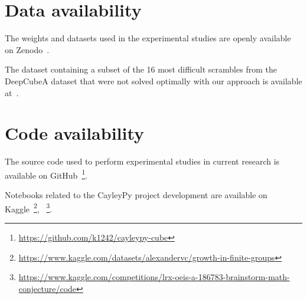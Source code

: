 
\section{Data availability}
The weights and datasets used in the experimental studies are openly available on Zenodo~\cite{chervov_dataset}.

The dataset containing a subset of the 16 most difficult scrambles from the DeepCubeA dataset that were not solved optimally with our approach is available at~\cite{chervov_hard}.

\phantom{42}

\section{Code availability}

The source code used to perform experimental studies in current research is available on GitHub~\footnote{\url{https://github.com/k1242/cayleypy-cube}}.

Notebooks related to the CayleyPy project development are available on Kaggle~\footnote{\url{https://www.kaggle.com/datasets/alexandervc/growth-in-finite-groups}}, ~\footnote{\url{https://www.kaggle.com/competitions/lrx-oeis-a-186783-brainstorm-math-conjecture/code}}.
